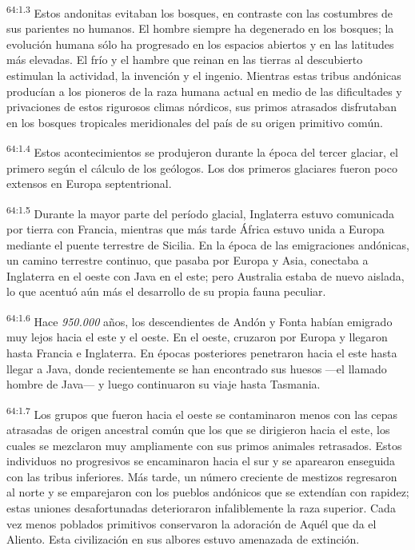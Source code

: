 \par
\textsuperscript{64:1.3} Estos andonitas evitaban los bosques, en contraste con las costumbres de sus parientes no humanos. El hombre siempre ha degenerado en los bosques; la evolución humana sólo ha progresado en los espacios abiertos y en las latitudes más elevadas. El frío y el hambre que reinan en las tierras al descubierto estimulan la actividad, la invención y el ingenio. Mientras estas tribus andónicas producían a los pioneros de la raza humana actual en medio de las dificultades y privaciones de estos rigurosos climas nórdicos, sus primos atrasados disfrutaban en los bosques tropicales meridionales del país de su origen primitivo común.

\par
\textsuperscript{64:1.4} Estos acontecimientos se produjeron durante la época del tercer glaciar, el primero según el cálculo de los geólogos. Los dos primeros glaciares fueron poco extensos en Europa septentrional.

\par
\textsuperscript{64:1.5} Durante la mayor parte del período glacial, Inglaterra estuvo comunicada por tierra con Francia, mientras que más tarde África estuvo unida a Europa mediante el puente terrestre de Sicilia. En la época de las emigraciones andónicas, un camino terrestre continuo, que pasaba por Europa y Asia, conectaba a Inglaterra en el oeste con Java en el este; pero Australia estaba de nuevo aislada, lo que acentuó aún más el desarrollo de su propia fauna peculiar.

\par
\textsuperscript{64:1.6} Hace \textit{950.000} años, los descendientes de Andón y Fonta habían emigrado muy lejos hacia el este y el oeste. En el oeste, cruzaron por Europa y llegaron hasta Francia e Inglaterra. En épocas posteriores penetraron hacia el este hasta llegar a Java, donde recientemente se han encontrado sus huesos ---el llamado hombre de Java--- y luego continuaron su viaje hasta Tasmania.

\par
\textsuperscript{64:1.7} Los grupos que fueron hacia el oeste se contaminaron menos con las cepas atrasadas de origen ancestral común que los que se dirigieron hacia el este, los cuales se mezclaron muy ampliamente con sus primos animales retrasados. Estos individuos no progresivos se encaminaron hacia el sur y se aparearon enseguida con las tribus inferiores. Más tarde, un número creciente de mestizos regresaron al norte y se emparejaron con los pueblos andónicos que se extendían con rapidez; estas uniones desafortunadas deterioraron infaliblemente la raza superior. Cada vez menos poblados primitivos conservaron la adoración de Aquél que da el Aliento. Esta civilización en sus albores estuvo amenazada de extinción.

